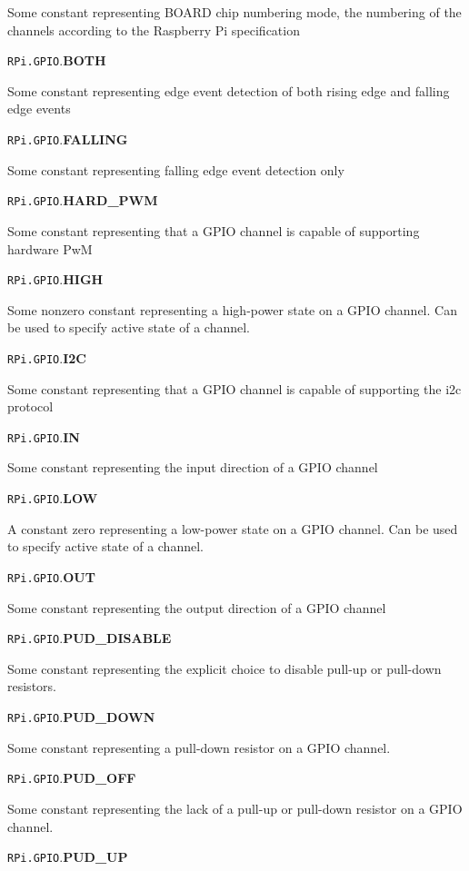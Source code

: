 \documentclass[12pt]{article}
\begin{document}
Some constant representing BOARD chip numbering mode, the numbering of the channels according to the Raspberry Pi specification

\noindent \texttt{RPi.GPIO}.\textbf{BOTH}

Some constant representing edge event detection of both rising edge and falling edge events

\noindent \texttt{RPi.GPIO}.\textbf{FALLING}

Some constant representing falling edge event detection only

\noindent \texttt{RPi.GPIO}.\textbf{HARD\_PWM}

Some constant representing that a GPIO channel is capable of supporting hardware PwM

\noindent \texttt{RPi.GPIO}.\textbf{HIGH}

Some nonzero constant representing a high-power state on a GPIO channel.
Can be used to specify active state of a channel.


\noindent \texttt{RPi.GPIO}.\textbf{I2C}

Some constant representing that a GPIO channel is capable of supporting the i2c protocol

\noindent \texttt{RPi.GPIO}.\textbf{IN}

Some constant representing the input direction of a GPIO channel

\noindent \texttt{RPi.GPIO}.\textbf{LOW}

A constant zero representing a low-power state on a GPIO channel.
Can be used to specify active state of a channel.

\noindent \texttt{RPi.GPIO}.\textbf{OUT}

Some constant representing the output direction of a GPIO channel

\noindent \texttt{RPi.GPIO}.\textbf{PUD\_DISABLE}

Some constant representing the explicit choice to disable pull-up or pull-down resistors.

\noindent \texttt{RPi.GPIO}.\textbf{PUD\_DOWN}

Some constant representing a pull-down resistor on a GPIO channel.

\noindent \texttt{RPi.GPIO}.\textbf{PUD\_OFF}

Some constant representing the lack of a pull-up or pull-down resistor on a GPIO channel.

\noindent \texttt{RPi.GPIO}.\textbf{PUD\_UP}
\end{document}
